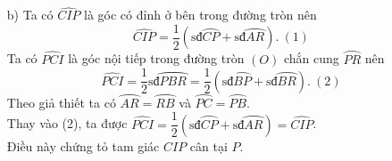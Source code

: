\begin{bt}
{{}
		\begin{enumerate}
			\item[b)] Ta có $ \widehat{CIP} $ là góc có đỉnh ở bên trong đường tròn nên
			$$\widehat{CIP}=\dfrac{1}{2}\left(\text{sđ}\wideparen{CP}+\text{sđ}\wideparen{AR} \right) . \ (1)$$
			Ta có $ \widehat{PCI} $ là góc nội tiếp trong đường tròn $ (O) $ chắn cung $ \wideparen{PR} $ nên
			$$\widehat{PCI}=\dfrac{1}{2}\text{sđ}\wideparen{PBR}=\dfrac{1}{2}\left(\text{sđ}\wideparen{BP}+\text{sđ}\wideparen{BR} \right) . \ (2)$$
			Theo giả thiết ta có $ \wideparen{AR}=\wideparen{RB} $ và $ \wideparen{PC}=\wideparen{PB} $.\\
			Thay vào (2), ta được $ \widehat{PCI}=\dfrac{1}{2}(\text{sđ}\wideparen{CP}+\text{sđ}\wideparen{AR})=\widehat{CIP} $.\\
			Điều này chứng tỏ tam giác $ CIP $ cân tại $ P $.
		\end{enumerate}
	}
\end{bt}



